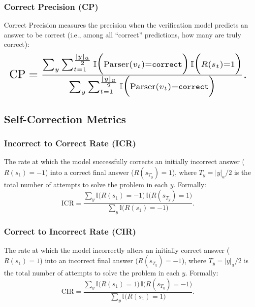 \subsubsection{Correct Precision (CP)}
Correct Precision measures the precision when the verification model predicts an answer to be correct (i.e., among all ``correct'' predictions, how many are truly correct):
\begin{equation}
\resizebox{\linewidth}{!}{$
\text{CP} = \frac{\sum_y\sum_{t=1}^\frac{|y|_a}{2}
    \mathbb{I}\Bigl(\text{Parser}(v_t)=\texttt{correct}\Bigr)\,
    \mathbb{I}\Bigl(R(s_{t})=1\Bigr)}
  {\sum_y\sum_{t=1}^\frac{|y|_a}{2}
    \mathbb{I}\Bigl(\text{Parser}(v_t)=\texttt{correct}\Bigr)}.
$}
\end{equation}

\subsection{Self-Correction Metrics}

\subsubsection{Incorrect to Correct Rate (ICR)}
The rate at which the model successfully corrects an initially incorrect answer ($R(s_1)=-1$) into a correct final answer ($R(s_{T_y})=1$), where $T_y=|y|_a/2$ is the total number of attempts to
solve the problem in each $y$. Formally:
\begin{equation}
\text{ICR} 
= \frac{\sum_y \mathbb{I}\bigl(R(s_1) = -1\bigr)\,\mathbb{I}\bigl(R(s_{T_y}) = 1\bigr)}
       {\sum_y \mathbb{I}\bigl(R(s_1) = -1\bigr)}.
\end{equation}

\subsubsection{Correct to Incorrect Rate (CIR)}
The rate at which the model incorrectly alters an initially correct answer ($R(s_1)=1$) into an incorrect final answer ($R(s_{T_y})=-1$), where $T_y=|y|_a/2$ is the total number of attempts to
solve the problem in each $y$. Formally:
\begin{equation}
\label{eq:correct_to_incorrect}
\text{CIR} 
= \frac{\sum_y \mathbb{I}\bigl(R(s_1) = 1\bigr)\,\mathbb{I}\bigl(R(s_{T_y}) = -1\bigr)}
       {\sum_y \mathbb{I}\bigl(R(s_1) = 1\bigr)}.
\end{equation}


